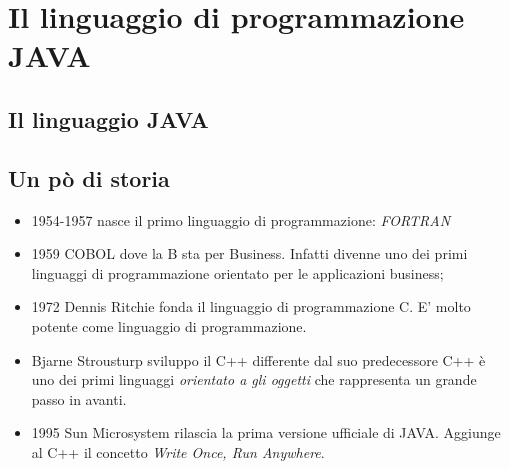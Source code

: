 \section{Il linguaggio di programmazione JAVA}
\begin{frame}
\begin{block}{}
\begin{center}
\large{}
\end{center}
\end{block}
\end{frame}

\subsection{Il linguaggio JAVA}
\subsection{Un pò di storia}
\begin{frame}
\begin{block}{}
\begin{itemize}
\item 1954-1957 nasce il primo linguaggio di programmazione: \itshape{FORTRAN}
\item 1959 COBOL dove la B sta per Business. Infatti divenne uno dei primi linguaggi di 
programmazione orientato per le applicazioni business;
\item 1972 Dennis Ritchie fonda il linguaggio di programmazione C. E' molto potente come linguaggio di 
programmazione. 
\item Bjarne Strousturp sviluppo il C++ differente dal suo predecessore C++ è uno dei primi linguaggi
\textit{orientato a gli oggetti} che rappresenta un grande passo in avanti.
\item 1995 Sun Microsystem rilascia la prima versione ufficiale di JAVA. Aggiunge al C++ il concetto
\textit{Write Once, Run Anywhere}.
\end{itemize}
\end{block}
\end{frame}

